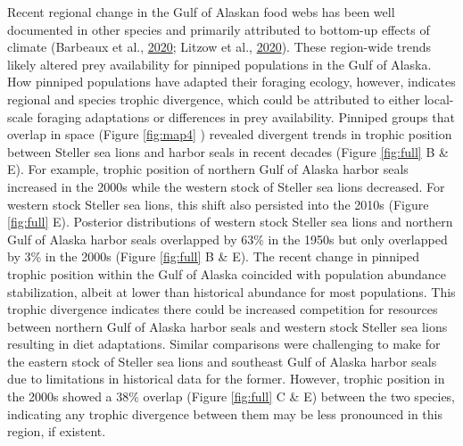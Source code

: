 \documentclass [11pt, proquest] {uwthesis}[2015/03/03]
\begin{document}
Recent regional change in the Gulf of Alaskan food webs has been well
documented in other species and primarily attributed to bottom-up
effects of climate (Barbeaux et al.,
\protect\hyperlink{ref-Barbeaux2020}{2020}; Litzow et al.,
\protect\hyperlink{ref-Litzow2020}{2020}). These region-wide trends
likely altered prey availability for pinniped populations in the Gulf of
Alaska. How pinniped populations have adapted their foraging ecology,
however, indicates regional and species trophic divergence, which could
be attributed to either local-scale foraging adaptations or differences
in prey availability. Pinniped groups that overlap in space (Figure
\ref{fig:map4} ) revealed divergent trends in trophic position between
Steller sea lions and harbor seals in recent decades (Figure
\ref{fig:full} B \& E). For example, trophic position of northern Gulf
of Alaska harbor seals increased in the 2000s while the western stock of
Steller sea lions decreased. For western stock Steller sea lions, this
shift also persisted into the 2010s (Figure \ref{fig:full} E). Posterior
distributions of western stock Steller sea lions and northern Gulf of
Alaska harbor seals overlapped by 63\% in the 1950s but only overlapped
by 3\% in the 2000s (Figure \ref{fig:full} B \& E). The recent change in
pinniped trophic position within the Gulf of Alaska coincided with
population abundance stabilization, albeit at lower than historical
abundance for most populations. This trophic divergence indicates there
could be increased competition for resources between northern Gulf of
Alaska harbor seals and western stock Steller sea lions resulting in
diet adaptations. Similar comparisons were challenging to make for the
eastern stock of Steller sea lions and southeast Gulf of Alaska harbor
seals due to limitations in historical data for the former. However,
trophic position in the 2000s showed a 38\% overlap (Figure
\ref{fig:full} C \& E) between the two species, indicating any trophic
divergence between them may be less pronounced in this region, if
existent.
\end{document}

